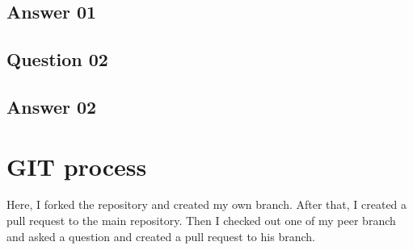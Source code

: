 \documentclass[11pt, letterpaper]{article}
\begin{document}
\subsection{Answer 01}
\subsection{Question 02}
\subsection{Answer 02}
\section{GIT process}
Here, I forked the repository and created my own branch. After that, I created a pull request to the main repository. Then I checked out one of my peer branch and asked a question and created a pull request to his branch.
\end{document}
